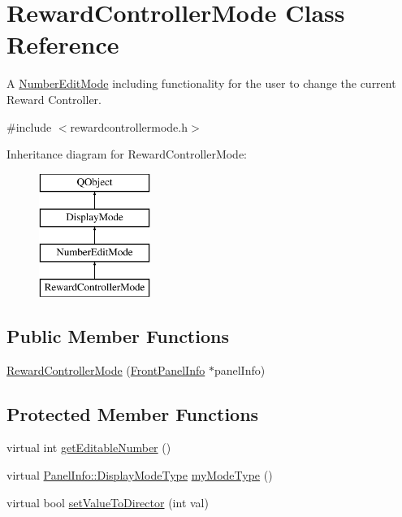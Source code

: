 \hypertarget{class_reward_controller_mode}{\section{Reward\-Controller\-Mode Class Reference}
\label{class_reward_controller_mode}
}


A \hyperlink{class_number_edit_mode}{Number\-Edit\-Mode} including functionality for the user to change the current Reward Controller.  




{\ttfamily \#include $<$rewardcontrollermode.\-h$>$}

Inheritance diagram for Reward\-Controller\-Mode\-:\begin{figure}[H]
\begin{center}
\leavevmode
\includegraphics[height=4.000000cm]{class_reward_controller_mode}
\end{center}
\end{figure}
\subsection*{Public Member Functions}
\begin{DoxyCompactItemize}
\item 
\hyperlink{class_reward_controller_mode_ab8d1a14ee21bb2d44f027c6e9298438e}{Reward\-Controller\-Mode} (\hyperlink{class_front_panel_info}{Front\-Panel\-Info} $\ast$panel\-Info)
\end{DoxyCompactItemize}
\subsection*{Protected Member Functions}
\begin{DoxyCompactItemize}
\item 
virtual int \hyperlink{class_reward_controller_mode_a0f73c18ab3b93b4343674618b44e3b2c}{get\-Editable\-Number} ()
\item 
virtual \hyperlink{namespace_panel_info_adb8b98e092c15e831aa524d39701d565}{Panel\-Info\-::\-Display\-Mode\-Type} \hyperlink{class_reward_controller_mode_a933b4465e6414cece6e3232bdb079fa1}{my\-Mode\-Type} ()
\item 
virtual bool \hyperlink{class_reward_controller_mode_a2322aa48a2cf9029ec069df388552fa2}{set\-Value\-To\-Director} (int val)
\end{DoxyCompactItemize}
